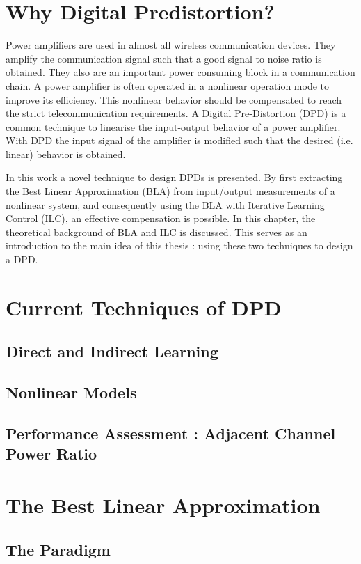 \section{Why Digital Predistortion?}
	
	Power amplifiers are used in almost all wireless communication devices. They amplify the communication signal such that a good signal to noise ratio is obtained. They also are an important power consuming block in a communication chain. A power amplifier is often operated in a nonlinear operation mode to improve its efficiency. This nonlinear behavior should be compensated to reach the strict telecommunication requirements.
	A Digital Pre-Distortion (DPD) is a common technique to linearise the input-output behavior of a power amplifier. With DPD the input signal of the amplifier is modified such that the desired (i.e. linear) behavior is obtained. 

	In this work a novel technique to design DPDs is presented. By first extracting the Best Linear Approximation (BLA) from input/output measurements of a nonlinear system, and consequently using the BLA with Iterative Learning Control (ILC), an effective compensation is possible. In this chapter, the theoretical background of BLA and ILC is discussed. This serves as an introduction to the main idea of this thesis : using these two techniques to design a DPD. 

\section{Current Techniques of DPD}
	\subsection{Direct and Indirect Learning}
	\subsection{Nonlinear Models}
	\subsection{Performance Assessment : Adjacent Channel Power Ratio}
\section{The Best Linear Approximation}

	\subsection{The Paradigm}

